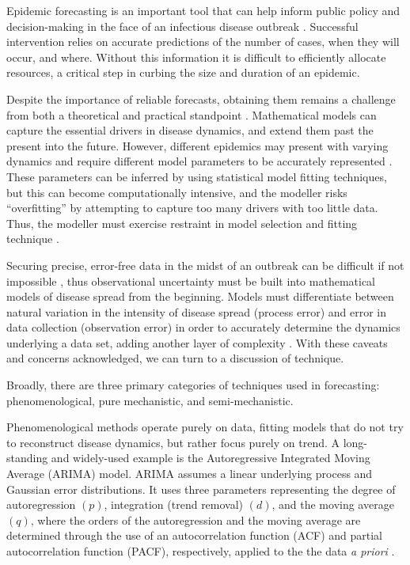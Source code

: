 
Epidemic forecasting is an important tool that can help inform public policy and decision-making in the face of an infectious disease outbreak \cite{Chretien2014}\cite{Nsoesie2014}\cite{Yang2014}. Successful intervention relies on accurate predictions of the number of cases, when they will occur, and where. Without this information it is difficult to efficiently allocate resources, a critical step in curbing the size and duration of an epidemic.

Despite the importance of reliable forecasts, obtaining them remains a challenge from both a theoretical and practical standpoint \cite{Nsoesie2014}. Mathematical models can capture the essential drivers in disease dynamics, and extend them past the present into the future. However, different epidemics may present with varying dynamics and require different model parameters to be accurately represented \cite{Camacho2011}. These parameters can be inferred by using statistical model fitting techniques, but this can become computationally intensive, and the modeller risks ``overfitting'' by attempting to capture too many drivers with too little data. Thus, the modeller must exercise restraint in model selection and fitting technique \cite{Babyak2004}.

Securing precise, error-free data in the midst of an outbreak can be difficult if not impossible \cite{Shaman2014}, thus observational uncertainty must be built into mathematical models of disease spread from the beginning. Models must differentiate between natural variation in the intensity of disease spread (process error) and error in data collection (observation error) in order to accurately determine the dynamics underlying a data set, adding another layer of complexity \cite{King2015}. With these caveats and concerns acknowledged, we can turn to a discussion of technique.

Broadly, there are three primary categories of techniques used in forecasting: phenomenological, pure mechanistic, and semi-mechanistic.

Phenomenological methods operate purely on data, fitting models that do not try to reconstruct disease dynamics, but rather focus purely on trend. A long-standing and widely-used example is the Autoregressive Integrated Moving Average (ARIMA) model. ARIMA assumes a linear underlying process and Gaussian error distributions. It uses three parameters representing the degree of autoregression $(p)$, integration (trend removal) $(d)$, and the moving average $(q)$, where the orders of the autoregression and the moving average are determined through the use of an autocorrelation function (ACF) and partial autocorrelation function (PACF), respectively, applied to the the data \textit{a priori} \cite{Zhang2013}.

